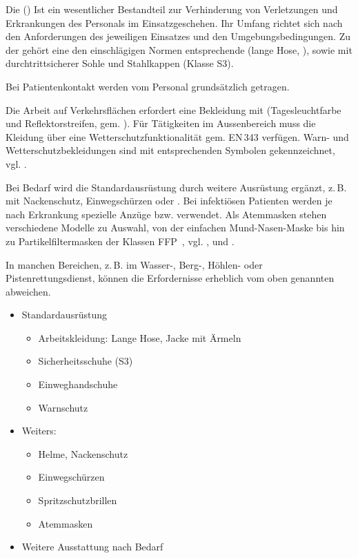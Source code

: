 {%
Die  () Ist ein
wesentlicher Bestandteil zur Verhinderung von Verletzungen
und Erkrankungen des Personals im Einsatzgeschehen. Ihr
Umfang richtet sich nach den Anforderungen des jeweiligen
Einsatzes und den Umgebungsbedingungen. Zu der
 gehört eine den einschlägigen Normen
entsprechende  (lange Hose, ), sowie  mit
durchtrittsicherer Sohle und Stahlkappen (Klasse S3).

Bei Patientenkontakt
werden vom Personal grundsätzlich 
getragen. 

Die Arbeit auf
Verkehrsflächen erfordert eine Bekleidung mit
 (Tagesleuchtfarbe und Reflektorstreifen, gem.
). Für Tätigkeiten im Aussenbereich muss die
Kleidung über eine Wetterschutzfunktionalität gem. EN\,343
verfügen. Warn- und Wetterschutzbekleidungen sind mit
entsprechenden Symbolen gekennzeichnet, vgl.
.


Bei Bedarf wird die Standardausrüstung durch weitere Ausrüstung
ergänzt, 
z.\,B.  mit Nackenschutz,
 Einwegschürzen oder
. 
Bei infektiösen
Patienten werden je nach Erkrankung spezielle Anzüge bzw.
 verwendet. Als Atemmasken stehen
verschiedene Modelle zu Auswahl, von der
einfachen Mund-Nasen-Maske bis hin zu Partikelfiltermasken
der Klassen FFP~, vgl.
, und
.

In manchen Bereichen, z.\,B. im Wasser-, Berg-, Höhlen- oder
Pistenrettungsdienst, können die Erfordernisse erheblich vom
oben genannten abweichen.}
{
\begin{itemize}
  \item Standardausrüstung
  \begin{itemize}
    \item Arbeitskleidung: Lange Hose, Jacke mit Ärmeln
    \item Sicherheitsschuhe (S3)
    \item Einweghandschuhe
    \item Warnschutz
  \end{itemize}
  \item Weiters:
  \begin{itemize}
    \item Helme, Nackenschutz
    \item Einwegschürzen
    \item Spritzschutzbrillen
    \item Atemmasken
  \end{itemize}
  \item Weitere Ausstattung nach Bedarf
\end{itemize}
}
{}
{}
{}


